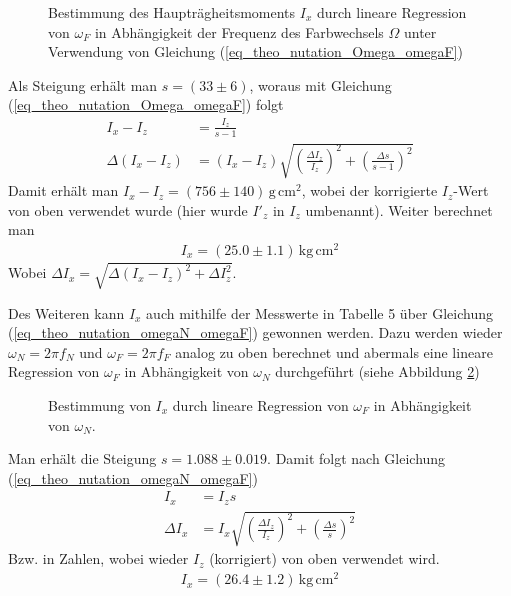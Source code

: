 \documentclass[12pt,a4paper,german]{scrartcl}
\numberwithin{equation}{section}
\begin{document}
  \begin{figure}[H]
    \centering
    
    \caption{Bestimmung des Haupträgheitsmoments $I_x$ durch lineare Regression von $\omega_F$ in Abhängigkeit der Frequenz des Farbwechsels $\Omega$ unter Verwendung von Gleichung (\ref{eq_theo_nutation_Omega_omegaF})}
    \label{fig_I_x_1}
  \end{figure}

  Als Steigung erhält man $s = (33 \pm 6)$, woraus mit Gleichung (\ref{eq_theo_nutation_Omega_omegaF}) folgt
  \begin{align}
    I_x - I_z &= \frac{I_z}{s - 1} \nonumber \\
    \Delta(I_x - I_z) &= (I_x - I_z) \sqrt{\left(\frac{\Delta I_z}{I_z}\right)^2 + \left(\frac{\Delta s}{s - 1}\right)^2}
  \end{align}
  Damit erhält man $I_x - I_z = (756 \pm 140) \, \text{g} \, \text{cm}^2$, wobei der korrigierte $I_z$-Wert von oben verwendet wurde (hier wurde $I'_z$ in $I_z$ umbenannt). Weiter berechnet man
  \begin{align}
    I_x = (25.0 \pm 1.1) \, \text{kg} \, \text{cm}^2
  \end{align}
  Wobei $\Delta I_x = \sqrt{\Delta(I_x - I_z)^2 + \Delta I_z^2}$.

  Des Weiteren kann $I_x$ auch mithilfe der Messwerte in Tabelle 5 über Gleichung (\ref{eq_theo_nutation_omegaN_omegaF}) gewonnen werden.
  Dazu werden wieder $\omega_N = 2 \pi f_N$ und $\omega_F = 2 \pi f_F$ analog zu oben berechnet und abermals eine lineare Regression von $\omega_F$ in Abhängigkeit von $\omega_N$ durchgeführt (siehe Abbildung \ref{fig_I_x_2})

  \begin{figure}[H]
    \centering
    
    \caption{Bestimmung von $I_x$ durch lineare Regression von $\omega_F$ in Abhängigkeit von $\omega_N$.}
    \label{fig_I_x_2}
  \end{figure}

  Man erhält die Steigung $s = 1.088 \pm 0.019$. Damit folgt nach Gleichung (\ref{eq_theo_nutation_omegaN_omegaF})
  \begin{align}
    I_x &= I_z s \nonumber \\
    \Delta I_x &= I_x \sqrt{\left(\frac{\Delta I_z}{I_z}\right)^2 + \left(\frac{\Delta s}{s}\right)^2}
  \end{align}
  Bzw. in Zahlen, wobei wieder $I_z$ (korrigiert) von oben verwendet wird.
  \begin{align}
    I_x = (26.4 \pm 1.2) \, \text{kg} \, \text{cm}^2
  \end{align}
\end{document}
